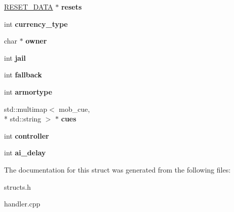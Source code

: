 \begin{DoxyCompactItemize}
\item 
\hypertarget{structmob__data_ace439f593d90207ac05d75f34db58f88}{\hyperlink{structreset__data}{R\-E\-S\-E\-T\-\_\-\-D\-A\-T\-A} $\ast$ {\bfseries resets}}\label{structmob__data_ace439f593d90207ac05d75f34db58f88}

\item 
\hypertarget{structmob__data_a468fd7308031d96fe90dec94b2a90479}{int {\bfseries currency\-\_\-type}}\label{structmob__data_a468fd7308031d96fe90dec94b2a90479}

\item 
\hypertarget{structmob__data_ae283015224d3cce92083d971872406b1}{char $\ast$ {\bfseries owner}}\label{structmob__data_ae283015224d3cce92083d971872406b1}

\item 
\hypertarget{structmob__data_aafe3b4337739cd440bfc06c1c6a94349}{int {\bfseries jail}}\label{structmob__data_aafe3b4337739cd440bfc06c1c6a94349}

\item 
\hypertarget{structmob__data_ad0ac1aea7c9f0ce31778855623a5e8e7}{int {\bfseries fallback}}\label{structmob__data_ad0ac1aea7c9f0ce31778855623a5e8e7}

\item 
\hypertarget{structmob__data_a48f53ae8473244cec6f713910a550263}{int {\bfseries armortype}}\label{structmob__data_a48f53ae8473244cec6f713910a550263}

\item 
\hypertarget{structmob__data_a88707b282a1daaf4897b4732cbae9ecc}{std\-::multimap$<$ mob\-\_\-cue, \\*
std\-::string $>$ $\ast$ {\bfseries cues}}\label{structmob__data_a88707b282a1daaf4897b4732cbae9ecc}

\item 
\hypertarget{structmob__data_a510f2eca7e0b6bec48d9b775924d0725}{int {\bfseries controller}}\label{structmob__data_a510f2eca7e0b6bec48d9b775924d0725}

\item 
\hypertarget{structmob__data_a8be7bdb4c9a2c2d99c6cb90cada65bcf}{int {\bfseries ai\-\_\-delay}}\label{structmob__data_a8be7bdb4c9a2c2d99c6cb90cada65bcf}

\end{DoxyCompactItemize}


The documentation for this struct was generated from the following files\-:\begin{DoxyCompactItemize}
\item 
structs.\-h\item 
handler.\-cpp\end{DoxyCompactItemize}
